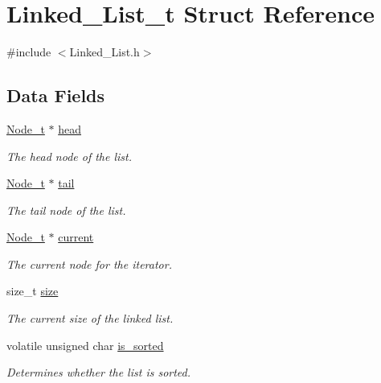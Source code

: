 \hypertarget{struct_linked___list__t}{}\section{Linked\+\_\+\+List\+\_\+t Struct Reference}
\label{struct_linked___list__t}


{\ttfamily \#include $<$Linked\+\_\+\+List.\+h$>$}

\subsection*{Data Fields}
\begin{DoxyCompactItemize}
\item 
\hyperlink{struct_node__t}{Node\+\_\+t} $\ast$ \hyperlink{struct_linked___list__t_aab355c5320dd0e9b2522141171a933d2}{head}
\begin{DoxyCompactList}\small\item\em The head node of the list. \end{DoxyCompactList}\item 
\hyperlink{struct_node__t}{Node\+\_\+t} $\ast$ \hyperlink{struct_linked___list__t_aca42aff10804c6229eae05f67c7cc6d7}{tail}
\begin{DoxyCompactList}\small\item\em The tail node of the list. \end{DoxyCompactList}\item 
\hyperlink{struct_node__t}{Node\+\_\+t} $\ast$ \hyperlink{struct_linked___list__t_abd89c0e7ede3521ca95bd5095a508543}{current}
\begin{DoxyCompactList}\small\item\em The current node for the iterator. \end{DoxyCompactList}\item 
size\+\_\+t \hyperlink{struct_linked___list__t_a854352f53b148adc24983a58a1866d66}{size}
\begin{DoxyCompactList}\small\item\em The current size of the linked list. \end{DoxyCompactList}\item 
volatile unsigned char \hyperlink{struct_linked___list__t_a98bae05ea50779d556f7cd282cc8d9bc}{is\+\_\+sorted}
\begin{DoxyCompactList}\small\item\em Determines whether the list is sorted. \end{DoxyCompactList}\item 

\end{DoxyCompactItemize}
